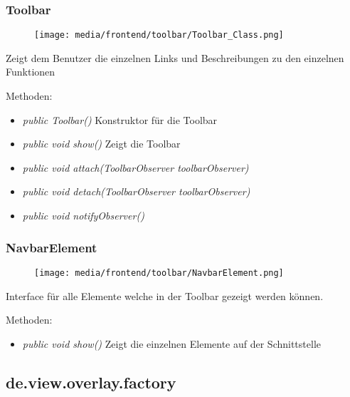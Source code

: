 \subsubsection{Toolbar}
\begin{minipage}{0.3\textwidth}
    \begin{figure}[H]
        \texttt{[image: media/frontend/toolbar/Toolbar\_Class.png]}
    \end{figure}
    \end{minipage} \hfill
    \begin{minipage}{0.6\textwidth}
Zeigt dem Benutzer die einzelnen Links und Beschreibungen zu den einzelnen Funktionen
\end{minipage}

Methoden:
\begin{itemize} 
    \item \emph{public Toolbar()} Konstruktor für die Toolbar
    \item \emph{public void show()} Zeigt die Toolbar
    \item \emph{public void attach(ToolbarObserver toolbarObserver)}
    \item \emph{public void detach(ToolbarObserver toolbarObserver)}
    \item \emph{public void notifyObserver()}
\end{itemize}

\subsubsection{NavbarElement}
\begin{minipage}{0.3\textwidth}
    \begin{figure}[H]
        \texttt{[image: media/frontend/toolbar/NavbarElement.png]}
    \end{figure}
    \end{minipage} \hfill
    \begin{minipage}{0.6\textwidth}
Interface für alle Elemente welche in der Toolbar gezeigt werden können.
\end{minipage}

Methoden:
\begin{itemize} 
    \item \emph{public void show()} Zeigt die einzelnen Elemente auf der Schnittstelle
\end{itemize}

\subsection{de.view.overlay.factory}

